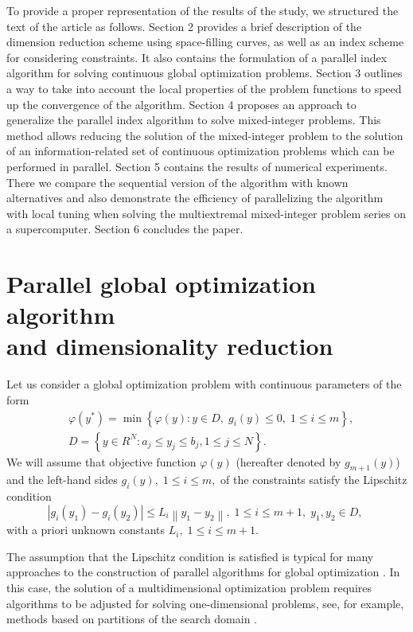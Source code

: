\documentclass[
11pt,%
tightenlines,%
twoside,%
onecolumn,%
nofloats,%
nobibnotes,%
nofootinbib,%
superscriptaddress,%
noshowpacs,%
centertags]%
{revtex4}
\begin{document}
To provide a proper representation of the results of the study, we structured the text of the article as follows.
Section 2 provides a brief description of the dimension reduction scheme using space-filling curves, as well as an index scheme for considering constraints. It also contains the formulation of a parallel index algorithm for solving continuous global optimization problems.
Section 3 outlines a way to take into account the local properties of the problem functions to speed up the convergence of the algorithm.
Section 4 proposes an approach to generalize the parallel index algorithm to solve mixed-integer problems. This method allows reducing the solution of the mixed-integer problem to the solution of an information-related set of continuous optimization problems which can be performed in parallel.
Section 5 contains the results of numerical experiments. There we compare the sequential version of the algorithm with known alternatives and also demonstrate the efficiency of parallelizing the algorithm with local tuning when solving the multiextremal mixed-integer problem series on a supercomputer.
Section 6 concludes the paper.

\section{Parallel global optimization algorithm\protect\\
and dimensionality reduction}

Let us consider a global optimization problem with continuous parameters of the form
\begin{eqnarray}\label{problem}
&\varphi(y^\ast)=\min{\left\{\varphi(y):y\in D, \; g_i(y)\leq 0, \; 1 \leq i \leq m\right\}},\\
&D=\left\{y\in R^N: a_j\leq y_j \leq b_j, 1\leq j \leq N \right\}.\label{D}
\end{eqnarray}
We will assume that objective function $\varphi(y)$ (hereafter denoted by $g_{m+1}(y)$) and the left-hand sides $g_i(y), \; 1\leq i \leq m,$ of the constraints satisfy the Lipschitz condition
\[
\left|g_i(y_1)-g_i(y_2)\right|\leq L_i\left\|y_1-y_2\right\|, \;1\leq i\leq m+1, \; y_1,y_2 \in D,\;
\]
with a priori unknown constants $L_i, \; 1 \leq i \leq m+1$.

The assumption that the Lipschitz condition is satisfied is typical for many approaches to the construction of parallel algorithms for global optimization \cite{Evtushenko2009,Zilinskas2011}. In this case, the solution of a multidimensional optimization problem requires algorithms to be adjusted for solving one-dimensional problems, see, for example, methods based on partitions of the search domain \cite{Zilinskas2014,Sergeyev2017}.
\end{document}
